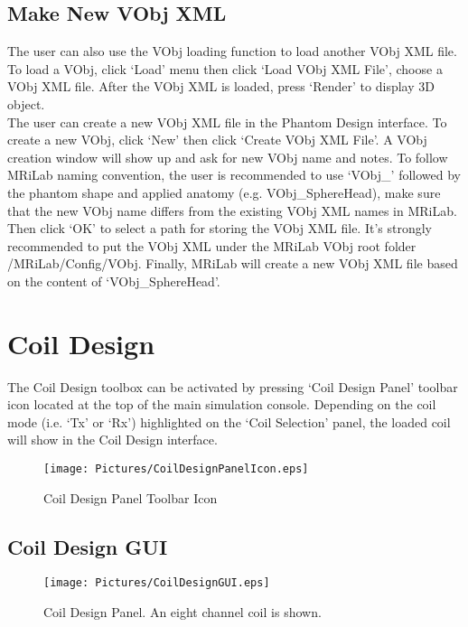 \documentclass{book}%
\begin{document}
\subsection{Make New VObj XML}

The user can also use the VObj loading function to load another VObj XML file. To load a VObj, click `Load' menu then click `Load VObj XML File', choose a VObj XML file. After the VObj XML is loaded, press `Render' to display 3D object.\\

The user can create a new VObj XML file in the Phantom Design interface. To create a new VObj, click `New' then click `Create VObj XML File'. A VObj creation window will show up and ask for new VObj name and notes. To follow MRiLab naming convention, the user is recommended to use `VObj\_' followed by the phantom shape and applied anatomy (e.g. VObj\_SphereHead), make sure that the new VObj name differs from the existing VObj XML names in MRiLab. Then click `OK' to select a path for storing the VObj XML file. It's strongly recommended to put the VObj XML under the MRiLab VObj root folder /MRiLab/Config/VObj. Finally, MRiLab will create a new VObj XML file based on the content of `VObj\_SphereHead'.

\section{Coil Design}

The Coil Design toolbox can be activated by pressing `Coil Design Panel' toolbar icon located at the top of the main simulation console. Depending on the coil mode (i.e. `Tx' or `Rx') highlighted on the `Coil Selection' panel, the loaded coil will show in the Coil Design interface.

\begin{figure}[htbp]
	\centering
		\texttt{[image: Pictures/CoilDesignPanelIcon.eps]}
	\caption{Coil Design Panel Toolbar Icon}
	\label{fig:CoilDesignPanelIcon}
\end{figure}

\subsection{Coil Design GUI}

\begin{figure}[htbp]
	\centering
		\texttt{[image: Pictures/CoilDesignGUI.eps]}
	\caption{Coil Design Panel. An eight channel coil is shown.}
	\label{fig:CoilDesignGUI}
\end{figure}
\end{document}
